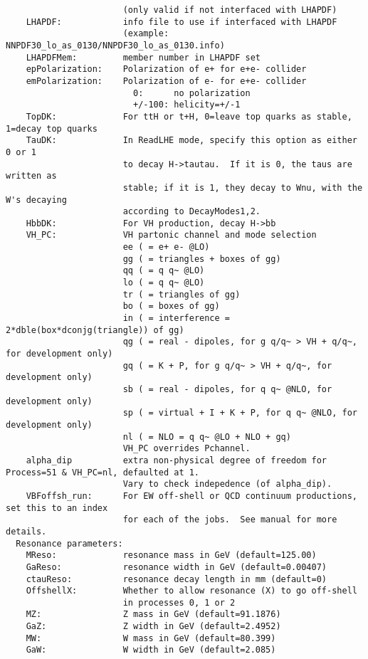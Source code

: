 \documentclass[aps,superscriptaddress,nofootinbib]{revtex4}
\begin{document}
\begin{verbatim}
                       (only valid if not interfaced with LHAPDF)
    LHAPDF:            info file to use if interfaced with LHAPDF
                       (example: NNPDF30_lo_as_0130/NNPDF30_lo_as_0130.info)
    LHAPDFMem:         member number in LHAPDF set
    epPolarization:    Polarization of e+ for e+e- collider
    emPolarization:    Polarization of e- for e+e- collider
                         0:      no polarization
                         +/-100: helicity=+/-1
    TopDK:             For ttH or t+H, 0=leave top quarks as stable, 1=decay top quarks
    TauDK:             In ReadLHE mode, specify this option as either 0 or 1
                       to decay H->tautau.  If it is 0, the taus are written as
                       stable; if it is 1, they decay to Wnu, with the W's decaying
                       according to DecayModes1,2.
    HbbDK:             For VH production, decay H->bb
    VH_PC:             VH partonic channel and mode selection
                       ee ( = e+ e- @LO)
                       gg ( = triangles + boxes of gg)
                       qq ( = q q~ @LO)
                       lo ( = q q~ @LO)
                       tr ( = triangles of gg)
                       bo ( = boxes of gg)
                       in ( = interference = 2*dble(box*dconjg(triangle)) of gg)
                       qg ( = real - dipoles, for g q/q~ > VH + q/q~, for development only)
                       gq ( = K + P, for g q/q~ > VH + q/q~, for development only)
                       sb ( = real - dipoles, for q q~ @NLO, for development only)
                       sp ( = virtual + I + K + P, for q q~ @NLO, for development only)
                       nl ( = NLO = q q~ @LO + NLO + gq)
                       VH_PC overrides Pchannel.
    alpha_dip          extra non-physical degree of freedom for Process=51 & VH_PC=nl, defaulted at 1.
                       Vary to check indepedence (of alpha_dip).
    VBFoffsh_run:      For EW off-shell or QCD continuum productions, set this to an index
                       for each of the jobs.  See manual for more details.
  Resonance parameters:
    MReso:             resonance mass in GeV (default=125.00)
    GaReso:            resonance width in GeV (default=0.00407)
    ctauReso:          resonance decay length in mm (default=0)
    OffshellX:         Whether to allow resonance (X) to go off-shell
                       in processes 0, 1 or 2
    MZ:                Z mass in GeV (default=91.1876)
    GaZ:               Z width in GeV (default=2.4952)
    MW:                W mass in GeV (default=80.399)
    GaW:               W width in GeV (default=2.085)

\end{verbatim}
\end{document}
